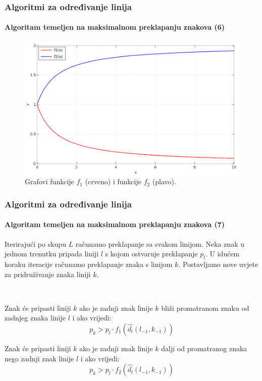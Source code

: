 \documentclass{beamer}
\begin{document}
\begin{frame}
\frametitle{Algoritmi za određivanje linija}
\framesubtitle{Algoritam temeljen na maksimalnom preklapanju znakova (6)}
\begin{figure}[htb]
    \centering
    \includegraphics[width=.8\textwidth]{images/function-01.png}
    \caption{Grafovi funkcije $f_1$ (crveno) i funkcije $f_2$ (plavo).}
    \label{fig:function-01}
\end{figure}
\end{frame}
\begin{frame}
\frametitle{Algoritmi za određivanje linija}
\framesubtitle{Algoritam temeljen na maksimalnom preklapanju znakova (7)}
Iterirajući po skupu $L$ računamo preklapanje sa svakom linijom.
Neka znak u jednom trenutku pripada liniji $l$ s kojom ostvaruje preklapanje $p_l$.
U idućem koraku iteracije računamo preklapanje znaka s linijom $k$.
Postavljamo nove uvjete za pridruživanje znaka liniji $k$.

\

Znak će pripasti liniji $k$ ako je zadnji znak linije $k$ bliži promatranom znaku
od zadnjeg znaka linije $l$ i ako vrijedi:
\begin{equation}
p_k > p_l \cdot f_1(\hat{d_l}(l_{-1},k_{-1}))
\end{equation}

Znak će pripasti liniji $k$ ako je zadnji znak linije $k$ dalji od promatranog znaka
nego zadnji znak linije $l$ i ako vrijedi:
\begin{equation}
p_k > p_l \cdot f_2(\hat{d_l}(l_{-1},k_{-1}))
\end{equation}
\end{frame}
\end{document}
